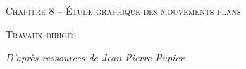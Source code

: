 \documentclass[10pt]{article}
\begin{document}

\begin{center}
\large{\textsc{Chapitre 8 --  Étude graphique des mouvements plans}}
\end{center}

\begin{center}
\textsc{Travaux dirigés}
\end{center}

\normalsize

\begin{flushright}
\textit{D'après ressources de Jean-Pierre Pupier.}
\end{flushright}

 \renewcommand{\baselinestretch}{1.2}
\end{document}
